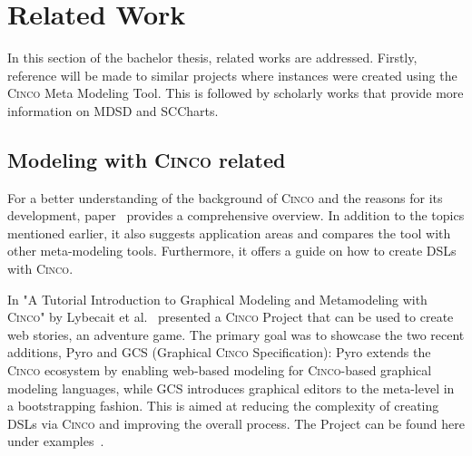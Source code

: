 \chapter{Related Work}\label{Related_Work}
In this section of the bachelor thesis, related works are addressed. Firstly, reference will be made to similar projects where instances were created using the \textsc{Cinco} Meta Modeling Tool. This is followed by scholarly works that provide more information on MDSD and SCCharts.
\section{Modeling with \textsc{Cinco} related}
For a better understanding of the background of \textsc{Cinco} and the reasons for its development, paper~\cite{Naujokat.2018} provides a comprehensive overview. In addition to the topics mentioned earlier, it also suggests application areas and compares the tool with other meta-modeling tools. Furthermore, it offers a guide on how to create DSLs with \textsc{Cinco}.

In "A Tutorial Introduction to Graphical Modeling and Metamodeling with \textsc{Cinco}" by Lybecait et al.~\cite{Lybecait.2018} presented a \textsc{Cinco} Project that can be used to create web stories, an adventure game. The primary goal was to showcase the two recent additions, Pyro and GCS (Graphical \textsc{Cinco} Specification): Pyro extends the \textsc{Cinco} ecosystem by enabling web-based modeling for \textsc{Cinco}-based graphical modeling languages, while GCS introduces graphical editors to the meta-level in a bootstrapping fashion. This is aimed at reducing the complexity of creating DSLs via \textsc{Cinco} and improving the overall process. The Project can be found here under examples~\cite{.06.05.2022}. 

